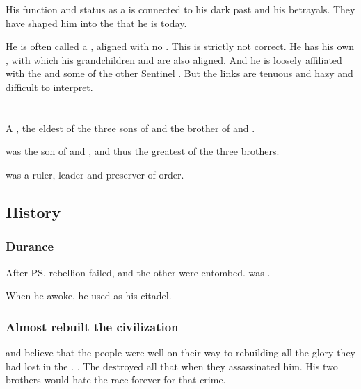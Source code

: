 His function and status as a \vertex{} is connected to his dark past and his betrayals. 
They have shaped him into the \vertex{} that he is today. 

He is often called a , aligned with no \matrix. 
This is strictly not correct. 
He has his own \matrix, with which his grandchildren and \Criseis{} are also aligned. 
And he is loosely affiliated with the  and some of the other Sentinel \matrices. 
But the links are tenuous and hazy and difficult to interpret. 















\section{\RaemythKhivaashNexagglachel}
\index{\RaemythKhivaashNexagglachel}
\index{\Nexagglachel}
A \shaeeroth, the eldest of the three sons of \Tiamat and the brother of \Ishnaruchaefir{} and \Secherdamon.

\Nexagglachel was the son of \Tiamat and \Sethicus, and thus the greatest of the three brothers.

\Nexagglachel{} was a ruler, leader and preserver of order. 









\subsection{History}





\subsubsection{Durance}
After \ps{\Sethicus} rebellion failed, \Nexagglachel and the other \dragons were entombed. 
\Nexagglachel was . 

When he awoke, he used \Nithdornazsh as his citadel. 





\subsubsection{Almost rebuilt the \draconian{} civilization}
\Secherdamon{} and \Ishnaruchaefir{} believe that the \draconian{} people were well on their way to rebuilding all the glory they had lost in the \firstbanewar. 
. 
The \resphain{} destroyed all that when they assassinated him. 
His two brothers would hate the \resphan race forever for that crime. 





